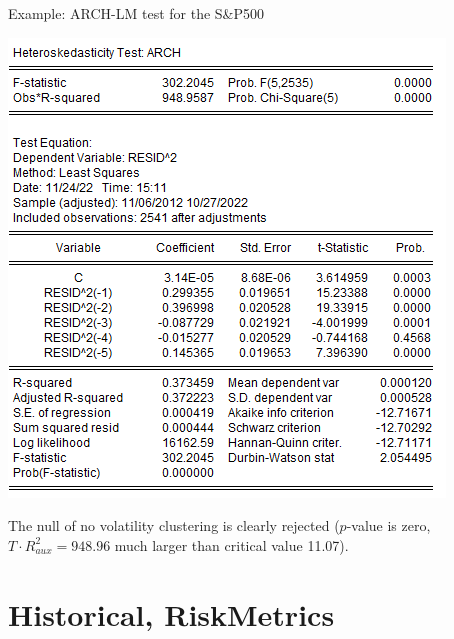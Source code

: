 \begin{frame}
\begin{block}{Example: ARCH-LM test for the S\&P500}
\begin{center}
\includegraphics[height=.6\textheight]{sp500_archlm}
\end{center}
\small The null of no volatility clustering is clearly rejected ($p$-value is zero, $T\cdot R^2_{aux}=948.96$ much larger than critical value 11.07).
\end{block}
\end{frame}

\section{Historical, RiskMetrics}\subsection*{}

